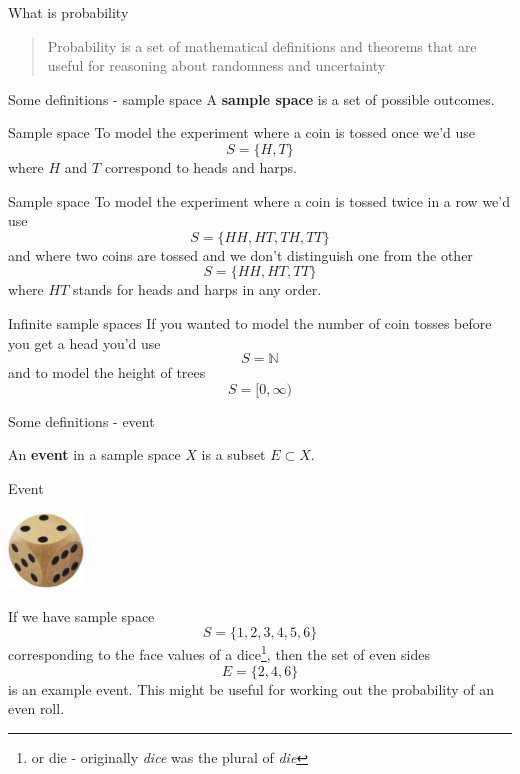\documentclass{beamer}
\newcommand{\crish}{\color{reddish}}
\newcommand{\cbla}{\color{black}}
\begin{document}
\begin{frame}{What is probability}
  \begin{quote}
    Probability is a set of mathematical definitions and theorems that
    are useful for reasoning about randomness and uncertainty
  \end{quote}
\end{frame}

\begin{frame}{Some definitions - sample space}
  A \textbf{sample space} is a set of possible outcomes. 
\end{frame}

\begin{frame}{Sample space}
  To model the experiment where a coin is tossed once we'd use
  \crish$$S=\{H,T\}$$\cbla{}
  where \crish$H$\cbla{} and \crish$T$\cbla{} correspond to heads and harps.
\end{frame}


\begin{frame}{Sample space}
  To model the experiment where a coin is tossed twice in a row we'd use
  \crish$$S=\{HH,HT,TH,TT\}$$\cbla{}
  and where two coins are tossed and we don't distinguish one from the other
  \crish$$S=\{HH,HT,TT\}$$\cbla{}
  where \crish$HT$\cbla{} stands for heads and harps in any order.
\end{frame}

\begin{frame}{Infinite sample spaces}
  If you wanted to model the number of coin tosses before you get a head you'd use
  \crish$$S=\mathbb{N}$$\cbla{}
  and to model the height of trees
  \crish$$S=[0,\infty)$$\cbla{}
\end{frame}

\begin{frame}{Some definitions - event}

  An \textbf{event} in a sample space \crish$X$\cbla{} is a subset \crish$E\subset X$\cbla{}.

\end{frame}

\begin{frame}{Event}
\begin{center}
    \includegraphics[width=2cm]{dice.jpg}
\end{center}  
If we have sample space \crish$$S=\{1,2,3,4,5,6\}$$\cbla{} corresponding to the
face values of a dice\footnote{or die - originally \textsl{dice} was the plural of \textsl{die}}, then the set of even sides \crish$$E=\{2,4,6\}$$\cbla{} is an
example event. This might be useful for working out the probability of an even roll.
\end{frame}
\end{document}
